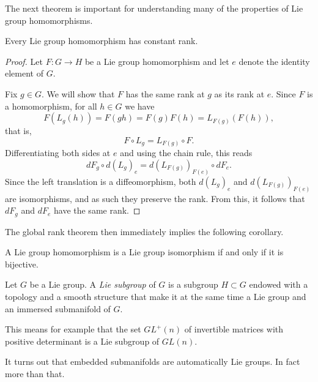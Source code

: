 The next theorem is important for understanding many of the properties of Lie group homomorphisms.

\begin{theorem}
  Every Lie group homomorphism has constant rank.
\end{theorem}
\begin{proof}
  Let $F:G\to H$ be a Lie group homomorphism and let $e$ denote the identity element of $G$.
  
  Fix $g\in G$.
  We will show that $F$ has the same rank at $g$ as its rank at $e$.
  Since $F$ is a homomorphism, for all $h\in G$ we have
  \begin{equation}
    F(L_g(h)) = F(gh) = F(g)F(h) = L_{F(g)}(F(h)),
  \end{equation}
  that is,
  \begin{equation}
    F\circ L_g = L_{F(g)}\circ F.
  \end{equation}
  Differentiating both sides at $e$ and using the chain rule, this reads
  \begin{equation}
    dF_g\circ d(L_g)_e = d(L_{F(g)})_{F(e)}\circ dF_e.
  \end{equation}
  Since the left translation is a diffeomorphism, both $d(L_g)_e$ and $d(L_{F(g)})_{F(e)}$ are isomorphisms, and as such they preserve the rank.
  From this, it follows that $dF_g$ and $dF_e$ have the same rank.
\end{proof}

The global rank theorem then immediately implies the following corollary.
\begin{corollary}
  A Lie group homomorphism is a Lie group isomorphism if and only if it is bijective.
\end{corollary}

\begin{definition}
  Let $G$ be a Lie group. A \emph{Lie subgroup} of $G$ is a subgroup $H\subset G$ endowed with a topology and a smooth structure that make it at the same time a Lie group and an immersed submanifold of $G$.
\end{definition}

\begin{example}
  This means for example that the set $GL^+(n)$ of invertible matrices with positive determinant is a Lie subgroup of $GL(n)$.
\end{example}

It turns out that embedded submanifolds are automatically Lie groups. In fact more than that.

